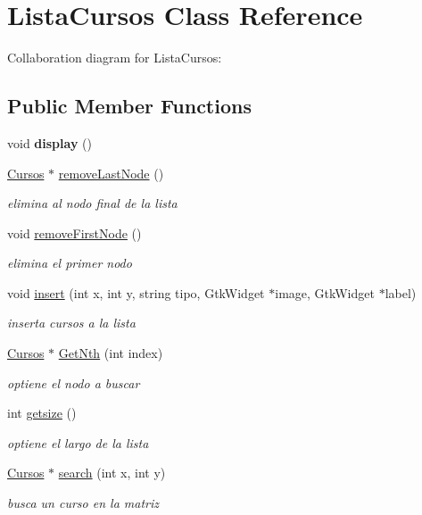 \hypertarget{classListaCursos}{}\section{Lista\+Cursos Class Reference}
\label{classListaCursos}


Collaboration diagram for Lista\+Cursos\+:
\subsection*{Public Member Functions}
\begin{DoxyCompactItemize}
\item 
\mbox{\label{classListaCursos_a01b9dc2b5011846c4751dc9bbb95d8d3}} 
void {\bfseries display} ()
\item 
\hyperlink{classCursos}{Cursos} $\ast$ \hyperlink{classListaCursos_a7832eb4a5ece08c1467228673a621af1}{remove\+Last\+Node} ()
\begin{DoxyCompactList}\small\item\em elimina al nodo final de la lista \end{DoxyCompactList}\item 
void \hyperlink{classListaCursos_a08247e012d20ba8740daa4621a152e5b}{remove\+First\+Node} ()
\begin{DoxyCompactList}\small\item\em elimina el primer nodo \end{DoxyCompactList}\item 
void \hyperlink{classListaCursos_ade9e462b89373b55f7e8596cb945a78d}{insert} (int x, int y, string tipo, Gtk\+Widget $\ast$image, Gtk\+Widget $\ast$label)
\begin{DoxyCompactList}\small\item\em inserta cursos a la lista \end{DoxyCompactList}\item 
\hyperlink{classCursos}{Cursos} $\ast$ \hyperlink{classListaCursos_a81dfb062a0308da32fd97ec25b7a84cc}{Get\+Nth} (int index)
\begin{DoxyCompactList}\small\item\em optiene el nodo a buscar \end{DoxyCompactList}\item 
int \hyperlink{classListaCursos_a8817e5ba536b0cd050eefb89400054d1}{getsize} ()
\begin{DoxyCompactList}\small\item\em optiene el largo de la lista \end{DoxyCompactList}\item 
\hyperlink{classCursos}{Cursos} $\ast$ \hyperlink{classListaCursos_a9a91363330c922741a5204bc89be5f16}{search} (int x, int y)
\begin{DoxyCompactList}\small\item\em busca un curso en la matriz \end{DoxyCompactList}\end{DoxyCompactItemize}
